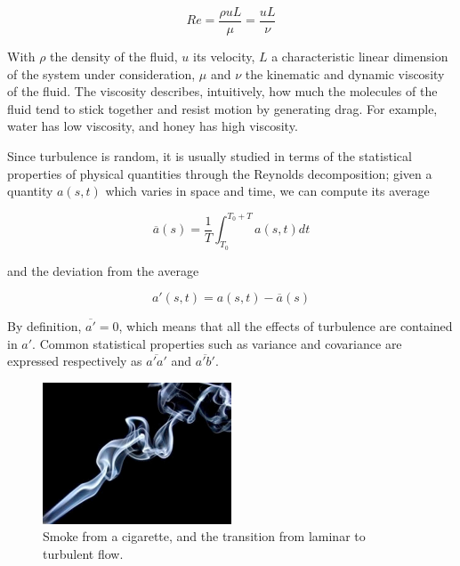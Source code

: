 \documentclass[a4paper]{book}
\begin{document}
$$
Re=\frac{\rho u L}{\mu}=\frac{uL}{\nu}
$$

With $\rho$ the density of the fluid, $u$ its velocity, $L$ a characteristic linear dimension of the system under consideration, $\mu$ and $\nu$ the kinematic and dynamic viscosity of the fluid. The viscosity describes, intuitively, how much the molecules of the fluid tend to stick together and resist motion by generating drag. For example, water has low viscosity, and honey has high viscosity.

Since turbulence is random, it is usually studied in terms of the statistical properties of physical quantities through the Reynolds decomposition; given a quantity $a(s,t)$ which varies in space and time, we can compute its average

$$
\overline{a}(s)=\frac{1}{T}\int_{T_0}^{T_0+T}a(s,t)dt
$$

and the deviation from the average

$$
a'(s,t)=a(s,t)-\overline{a}(s)
$$

By definition, $\overline{a'}=0$, which means that all the effects of turbulence are contained in $a'$. Common statistical properties such as variance and covariance are expressed respectively as $\overline{a'a'}$ and $\overline{a'b'}$.

\begin{figure}
\caption{Smoke from a cigarette, and the transition from laminar to turbulent flow.}
\label{fig:smoke}
\centering
\includegraphics[width=0.5\textwidth]{images/smoke}
\end{figure}
\end{document}
